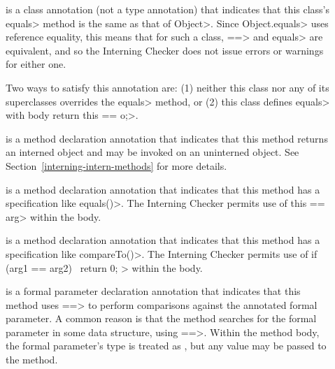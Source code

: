 \begin{description}

\item[]
  is a class annotation (not a type annotation) that indicates that this class's
  \<equals> method is the same as that of \<Object>.  Since
  \<Object.equals> uses reference equality, this means that for such a
  class, \<==> and \<equals> are equivalent, and so the Interning Checker
  does not issue errors or warnings for either one.

  Two ways to satisfy this annotation are:  (1) neither this class nor any
  of its superclasses overrides the \<equals> method, or (2) this class
  defines \<equals> with body \<return this == o;>.

\item[]
  is a method declaration annotation that indicates that this method
  returns an interned object and may be invoked
  on an uninterned object. See Section~\ref{interning-intern-methods} for more details.

\item[]
  is a method declaration annotation that indicates that this method
  has a specification like \<equals()>.  The Interning Checker permits use
  of \<this == arg> within the body.

\item[]
  is a method declaration annotation that indicates that this method
  has a specification like \<compareTo()>.  The Interning Checker permits use
  of \<if (arg1 == arg2) \ttlcb\ return 0; \ttrcb> within the body.

\item[]
  is a formal parameter declaration annotation that indicates that this
  method uses \<==> to perform comparisons against the annotated formal
  parameter.  A common reason is that the method searches for the formal
  parameter in some data structure, using \<==>.  Within the method body,
  the formal parameter's type is treated as
  , but any value
  may be passed to the method.
\end{description}


